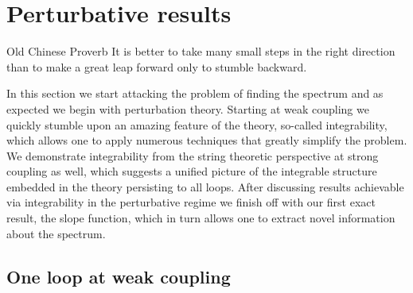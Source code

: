 
\section{Perturbative results}
\label{sec:integrability}

\begin{chapquote}{Old Chinese Proverb}
It is better to take many small steps in the right direction than to make a great leap forward only to stumble backward.
\end{chapquote}

\noindent In this section we start attacking the problem of finding the spectrum and as expected we begin with perturbation theory.
Starting at weak coupling we quickly stumble upon an amazing feature of the theory, so-called integrability, which allows one to apply numerous techniques that greatly simplify the problem.
We demonstrate integrability from the string theoretic perspective at strong coupling as well, which suggests a unified picture of the integrable structure embedded in the theory persisting to all loops.
After discussing results achievable via integrability in the perturbative regime we finish off with our first exact result, the slope function, which in turn allows one to extract novel information about the spectrum.

\subsection{One loop at weak coupling}
\label{sec:integrability_weak}

